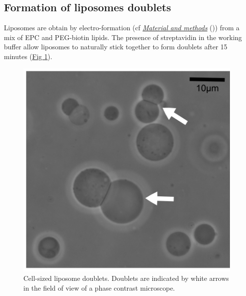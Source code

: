 \documentclass[A4paperpaper,11pt,english]{sphinxmanual}
\begin{document}
\subsection{Formation of liposomes doublets}
\label{index-latex:formation-of-liposomes-doublets}
Liposomes are obtain by electro-formation (cf {\hyperref[index-latex:electroformation]{\emph{Material and methods}}} ()) from a mix of EPC and PEG-biotin lipids. The presence of
streptavidin in the working buffer allow liposomes to naturally stick together
to form doublets after 15 minutes (\hyperref[index-latex:fig1a]{Fig  \ref*{index-latex:fig1a}}).
\begin{figure}[htbp]
\centering
\capstart

\includegraphics[width=0.500\linewidth]{Fig_01-A.png}
\caption{Cell-sized liposome doublets. Doublets are indicated by white arrows in
the field of view of a phase contrast microscope.}\label{index-latex:fig1a}\end{figure}
\end{document}
